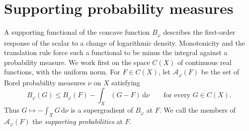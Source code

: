 \section{Supporting probability measures}\label{sec:normalization-supports}

A supporting functional of the concave function $B_\varphi$ describes the first-order response of the scalar to a change of logarithmic density. Monotonicity and the translation rule force such a functional to be minus the integral against a probability measure. We work first on the space $C(X)$ of continuous real functions, with the uniform norm. For $F\in C(X)$, let $\mathcal A_\varphi(F)$ be the set of Borel probability measures $\nu$ on $X$ satisfying
\begin{equation}\label{eq:adjoint-probability-set}
 B_\varphi(G)\leq B_\varphi(F)-\int_X(G-F)\,\mathrm{d}\nu
 \qquad\text{for every }G\in C(X).
\end{equation}
Thus $G\mapsto-\int_XG\,\mathrm{d}\nu$ is a supergradient of $B_\varphi$ at $F$. We call the members of $\mathcal A_\varphi(F)$ the \emph{supporting probabilities} at $F$.

